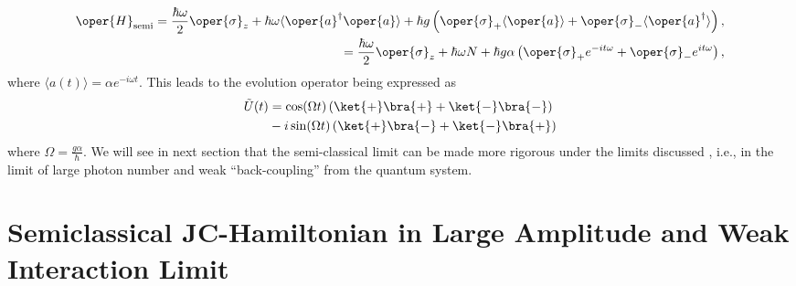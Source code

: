\begin{equation}
    \label{eq:chap5_JCM_Hamiltonian_semi}
    \begin{aligned}
        \oper{H}_{\text{semi}} = \frac{\hbar\omega}{2} \oper{\sigma}_z + \hbar \omega \langle \oper{a}^\dagger \oper{a} \rangle
    + \hbar g \left( \oper{\sigma}_+ \langle \oper{a} \rangle + \oper{\sigma}_- \langle \oper{a}^\dagger \rangle \right),\\
    = \frac{\hbar\omega}{2} \oper{\sigma}_z + \hbar \omega N 
    + \hbar g \alpha\left( \oper{\sigma}_+ e^{-it\omega} + \oper{\sigma}_- e^{it\omega} \right),
    \end{aligned}
\end{equation}
where \(\langle a(t) \rangle = \alpha e^{-i\omega t}\). This leads to the evolution operator being expressed as
\begin{align}
        \tilde{U}(t) &= 
                \cos(\Omega t) \left(\ket{+}\bra{+} + 
                \ket{-}\bra{-} \right)  \nonumber\\
                &- i \sin(\Omega t)
                 \left( \ket{+}\bra{-}
                +\ket{-}\bra{+}\right)
\end{align}
where \(\Omega = \frac{g\alpha}{\hbar}\). We will see in next section that the semi-classical limit can be made more rigorous
under the limits discussed , i.e., in the limit of 
large photon number and weak ``back-coupling'' from the quantum system.

\section{Semiclassical JC-Hamiltonian  in Large Amplitude and Weak Interaction Limit\label{sec:chap5_large_amplitude_weak_g}}

